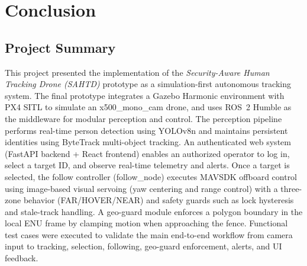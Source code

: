 \documentclass[12pt,a4paper]{report}
\begin{document}
\chapter{Conclusion}

\section{Project Summary}
This project presented the implementation of the \textit{Security-Aware Human Tracking Drone (SAHTD)} prototype as a simulation-first autonomous tracking system. The final prototype integrates a Gazebo Harmonic environment with \ac{PX4} \ac{SITL} to simulate an x500\_mono\_cam drone, and uses ROS~2 Humble as the middleware for modular perception and control. The perception pipeline performs real-time person detection using YOLOv8n and maintains persistent identities using ByteTrack multi-object tracking. An authenticated web system (FastAPI backend + React frontend) enables an authorized operator to log in, select a target ID, and observe real-time telemetry and alerts. Once a target is selected, the follow controller (follow\_node) executes \ac{MAVSDK} offboard control using image-based visual servoing (yaw centering and range control) with a three-zone behavior (FAR/HOVER/NEAR) and safety guards such as lock hysteresis and stale-track handling. A geo-guard module enforces a polygon boundary in the local \ac{ENU} frame by clamping motion when approaching the fence. Functional test cases were executed to validate the main end-to-end workflow from camera input to tracking, selection, following, geo-guard enforcement, alerts, and UI feedback.
\end{document}
